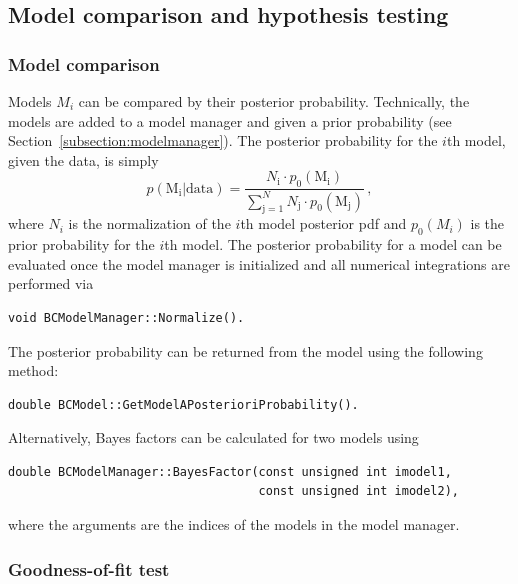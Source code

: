 \documentclass[11pt, a4paper]{article}
\begin{document}

\subsection{Model comparison and hypothesis testing}


\subsubsection{Model comparison}

Models $M_{i}$ can be compared by their posterior
probability. Technically, the models are added to a model manager and
given a prior probability (see
Section~\ref{subsection:modelmanager}). The posterior probability for
the $i$th model, given the data, is simply
%
\begin{equation}
p(\mathrm{M_{i}}|\mathrm{data}) = \frac{N_{\mathrm{i}} \cdot p_{0}(\mathrm{M_{i}})}{\sum_{\mathrm{j} = 1}^{N} N_{\mathrm{j}} \cdot p_{0}(\mathrm{M_{j}})} \, ,
\end{equation}
%
where $N_{i}$ is the normalization of the $i$th model posterior pdf
and $p_{0}(M_{i})$ is the prior probability for the $i$th model. The
posterior probability for a model can be evaluated once the model
manager is initialized and all numerical integrations are performed
via
%
\begin{verbatim}
void BCModelManager::Normalize().
\end{verbatim}
%
The posterior probability can be returned from the model using the
following method:
%
\begin{verbatim}
double BCModel::GetModelAPosterioriProbability().
\end{verbatim}

Alternatively, Bayes factors can be calculated for two models using
%
\begin{verbatim}
double BCModelManager::BayesFactor(const unsigned int imodel1,
                                   const unsigned int imodel2),
\end{verbatim}
%
where the arguments are the indices of the models in the model
manager.



\subsubsection{Goodness-of-fit test}
\end{document}
